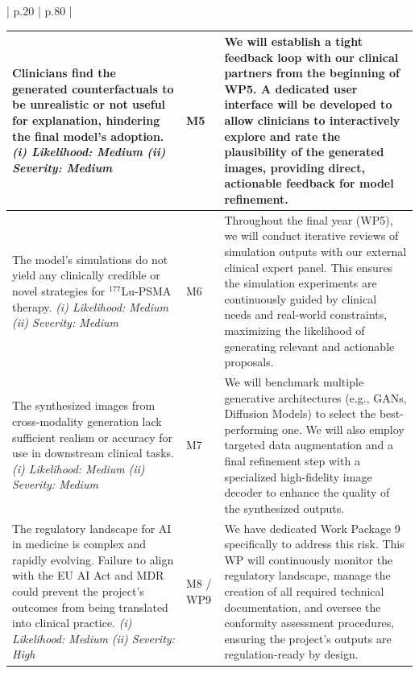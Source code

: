 \documentclass[11pt, a4paper]{article}
\begin{document}
\begin{longtable}{| p{} | p{} |}
\begin{longtable}{|L{0.3\textwidth}|L{0.1\textwidth}|L{0.5\textwidth}|}
Clinicians find the generated counterfactuals to be unrealistic or not useful for explanation, hindering the final model's adoption.
\newline\textit{(i) Likelihood: Medium}
\newline\textit{(ii) Severity: Medium}
& M5
& We will establish a tight feedback loop with our clinical partners from the beginning of WP5. A dedicated user interface will be developed to allow clinicians to interactively explore and rate the plausibility of the generated images, providing direct, actionable feedback for model refinement. \\
\hline

The model's simulations do not yield any clinically credible or novel strategies for $^{177}$Lu-PSMA therapy.
\newline\textit{(i) Likelihood: Medium}
\newline\textit{(ii) Severity: Medium}
& M6
& Throughout the final year (WP5), we will conduct iterative reviews of simulation outputs with our external clinical expert panel. This ensures the simulation experiments are continuously guided by clinical needs and real-world constraints, maximizing the likelihood of generating relevant and actionable proposals. \\
\hline

The synthesized images from cross-modality generation lack sufficient realism or accuracy for use in downstream clinical tasks.
\newline\textit{(i) Likelihood: Medium}
\newline\textit{(ii) Severity: Medium}
& M7
& We will benchmark multiple generative architectures (e.g., GANs, Diffusion Models) to select the best-performing one. We will also employ targeted data augmentation and a final refinement step with a specialized high-fidelity image decoder to enhance the quality of the synthesized outputs. \\
\hline

The regulatory landscape for AI in medicine is complex and rapidly evolving. Failure to align with the EU AI Act and MDR could prevent the project's outcomes from being translated into clinical practice.
\newline\textit{(i) Likelihood: Medium}
\newline\textit{(ii) Severity: High}
& M8 / WP9
& We have dedicated Work Package 9 specifically to address this risk. This WP will continuously monitor the regulatory landscape, manage the creation of all required technical documentation, and oversee the conformity assessment procedures, ensuring the project's outputs are regulation-ready by design. \\


\end{longtable}
\end{longtable}
\end{document}

